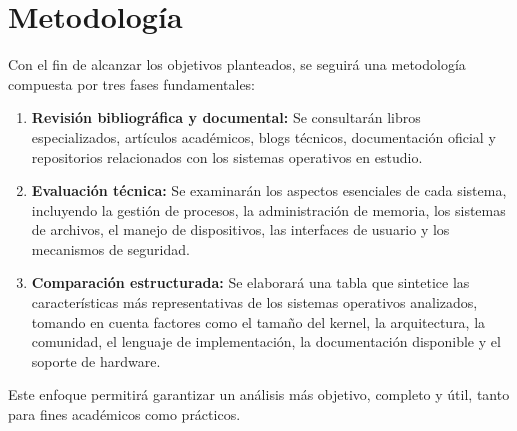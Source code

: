 \section*{Metodología}
{}

Con el fin de alcanzar los objetivos planteados, se seguirá una metodología compuesta por tres fases fundamentales:

\begin{enumerate}
\item \textbf{Revisión bibliográfica y documental:} Se consultarán libros especializados, artículos académicos, blogs técnicos, documentación oficial y repositorios relacionados con los sistemas operativos en estudio.

\item \textbf{Evaluación técnica:} Se examinarán los aspectos esenciales de cada sistema, incluyendo la gestión de procesos, la administración de memoria, los sistemas de archivos, el manejo de dispositivos, las interfaces de usuario y los mecanismos de seguridad.  

\item \textbf{Comparación estructurada:} Se elaborará una tabla que sintetice las características más representativas de los sistemas operativos analizados, tomando en cuenta factores como el tamaño del kernel, la arquitectura, la comunidad, el lenguaje de implementación, la documentación disponible y el soporte de hardware.  


\end{enumerate}

Este enfoque permitirá garantizar un análisis más objetivo, completo y útil, tanto para fines académicos como prácticos.

